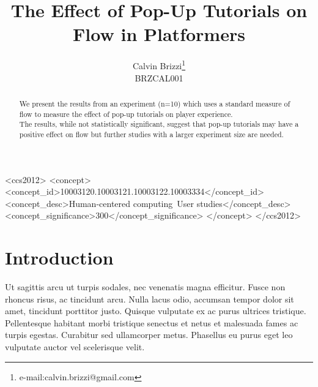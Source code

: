 \documentclass{acmsiggraph}
\title{The Effect of Pop-Up Tutorials on Flow in Platformers}
\author{Calvin Brizzi\thanks{e-mail:calvin.brizzi@gmail.com}\\BRZCAL001}
\begin{document}


\maketitle

\begin{abstract}

We present the results from an experiment (n=10) which uses a standard measure of flow to measure the effect of pop-up tutorials on player experience.\\
The results, while not statistically significant, suggest that pop-up tutorials may have a positive effect on flow but further studies with a larger experiment size are needed.

\end{abstract}

%
%
\begin{CCSXML}
<ccs2012>
<concept>
<concept_id>10003120.10003121.10003122.10003334</concept_id>
<concept_desc>Human-centered computing~User studies</concept_desc>
<concept_significance>300</concept_significance>
</concept>
</ccs2012>
\end{CCSXML}


%
%


\keywordlist

\conceptlist

\printcopyright

\section{Introduction}

Ut sagittis arcu ut turpis sodales, nec venenatis magna efficitur. Fusce non rhoncus risus, ac tincidunt arcu. Nulla lacus odio, accumsan tempor dolor sit amet, tincidunt porttitor justo. Quisque vulputate ex ac purus ultrices tristique. Pellentesque habitant morbi tristique senectus et netus et malesuada fames ac turpis egestas. Curabitur sed ullamcorper metus. Phasellus eu purus eget leo vulputate auctor vel scelerisque velit.
\end{document}
